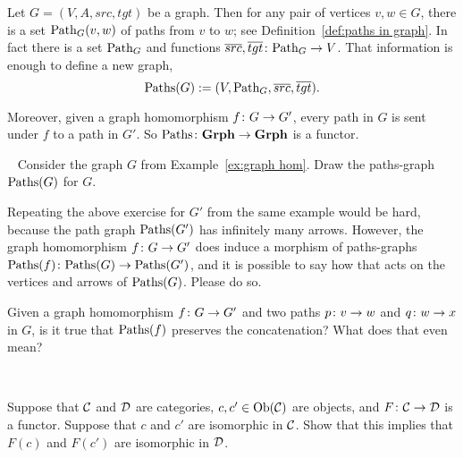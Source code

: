 \documentclass[CT4S-EN-RU]{subfiles}
\begin{document}
\begin{exerciseRUS}\label{exc:rephrase functors}
\end{exerciseRUS}

\begin{exampleENG}\label{ex:paths-graph}
Let $G=(V,A,src,tgt)$ be a graph. Then for any pair of vertices $v,w\in G$, there is a set $\textnormal{Path}_G(v,w)$ of paths from $v$ to $w$; see Definition~\ref{def:paths in graph}. In fact there is a set $\textnormal{Path}_G$ and functions $\overline{src},\overline{tgt}\colon\textnormal{Path}_G\rightarrow V$. That information is enough to define a new graph, $$\textnormal{Paths}(G):=(V,\textnormal{Path}_G,\overline{src},\overline{tgt}).$$

Moreover, given a graph homomorphism $f\colon G\rightarrow G'$, every path in $G$ is sent under $f$ to a path in $G'$. So $\textnormal{Paths}\colon{\mathbf{Grph}}\rightarrow{\mathbf{Grph}}$ is a functor.
\end{exampleENG}

\begin{exampleRUS}\label{ex:paths-graph}
\end{exampleRUS}

\begin{exerciseENG}\label{exc:morphisms on paths-graphs}~
\sexc Consider the graph $G$ from Example~\ref{ex:graph hom}. Draw the paths-graph $\textnormal{Paths}(G)$ for $G$. 
\item Repeating the above exercise for $G'$ from the same example would be hard, because the path graph $\textnormal{Paths}(G')$ has infinitely many arrows. However, the graph homomorphism $f\colon G\rightarrow G'$ does induce a morphism of paths-graphs $\textnormal{Paths}(f)\colon\textnormal{Paths}(G)\rightarrow\textnormal{Paths}(G')$, and it is possible to say how that acts on the vertices and arrows of $\textnormal{Paths}(G)$. Please do so.
\item Given a graph homomorphism $f\colon G\rightarrow G'$ and two paths $p\colon v\rightarrow w$ and $q\colon w\rightarrow x$ in $G$, is it true that $\textnormal{Paths}(f)$ preserves the concatenation? What does that even mean?
\endsexc
\end{exerciseENG}

\begin{exerciseRUS}\label{exc:morphisms on paths-graphs}~
\end{exerciseRUS}

\begin{exerciseENG}\label{exc:functors preserve isos}
Suppose that $\mathcal{C}$ and $\mathcal{D}$ are categories, $c,c'\in\textnormal{Ob}(\mathcal{C})$ are objects, and $F\colon\mathcal{C}\rightarrow\mathcal{D}$ is a functor. Suppose that $c$ and $c'$ are isomorphic in $\mathcal{C}$. Show that this implies that $F(c)$ and $F(c')$ are isomorphic in $\mathcal{D}$.
\end{exerciseENG}
\end{document}
